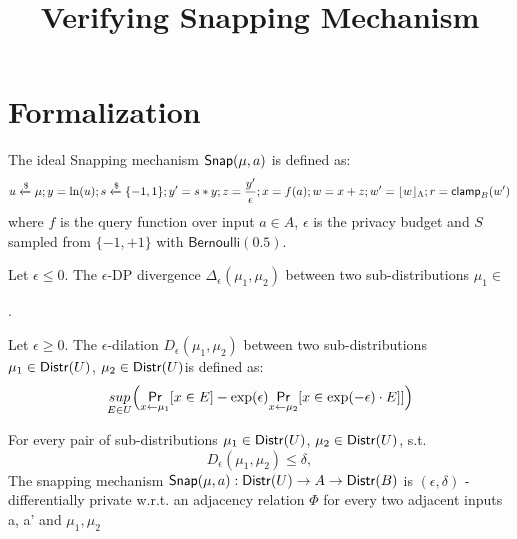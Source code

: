 \documentclass{article}
\begin{document}
\title{Verifying Snapping Mechanism}

\maketitle

\section{Formalization}
\begin{defn}
The ideal Snapping mechanism $\mathsf{Snap}(\mu, a)$ is defined as:
\[
	u \xleftarrow{\$} \mu; y = \ln (u); s \xleftarrow{\$} \{-1, 1\}; y' = s * y; z = \frac{y'}{\epsilon}; x = f(a); w = x + z; w' = \lfloor w \rfloor_{\Lambda}; r = \mathsf{clamp}_B (w')
\]
where $f$ is the query function over input $a \in A$, $\epsilon$ is the privacy budget and $S$ sampled from $ \{-1, +1\}$ with $\mathsf{Bernoulli}(0.5)$.
\end{defn}

\begin{defn}
Let $\epsilon \leq 0$. The $\epsilon${\text -DP divergence} $\Delta_{\epsilon}(\mu_1, \mu_2)$ between two sub-distributions $\mu_1 \in $ 
\end{defn}

\begin{defn}
.

Let $\epsilon \geq 0$. The $\epsilon$-dilation $D_{\epsilon}(\mu_1, \mu_2)$ between two sub-distributions $\mu_1 \in \mathsf{Distr}(U)$, $\mu_2 \in \mathsf{Distr}(U)$is defined as:
\[	
	\underset{E \in U}{sup}\Big(\underset{x \leftarrow \mu_1}{\mathsf{Pr}}[x \in E] - \exp(\epsilon) \underset{x \leftarrow \mu_2}{\mathsf{Pr}}[x \in \exp(-\epsilon) \cdot E]]\Big)
\]
\end{defn}

\begin{prop}
For every pair of sub-distributions $\mu_1 \in \mathsf{Distr}(U)$, $\mu_2 \in \mathsf{Distr}(U)$, s.t. 
\[
D_{\epsilon}(\mu_1, \mu_2) \leq \delta,
\]
The snapping mechanism $\mathsf{Snap}(\mu, a) : \mathsf{Distr}(U) \to A \to \mathsf{Distr}(B)$ is $(\epsilon, \delta)$ - differentially private w.r.t. an adjacency relation $\Phi$ for every two adjacent inputs a, a’ and $\mu_1, \mu_2$
\end{prop}
\end{document}
